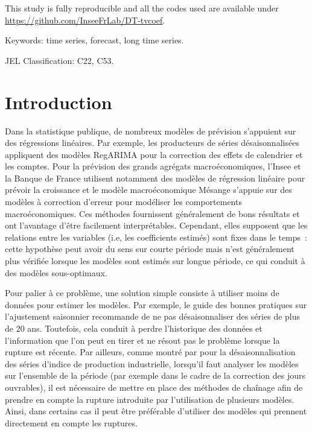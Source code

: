 \documentclass[
  a4paper,
  DIV=11,
  numbers=noendperiod,
  french]{scrartcl}
\newcommand\1{{\mathds 1}}
\theoremstyle{remark}
\begin{document}
This study is fully reproducible and all the codes used are available
under \url{https://github.com/InseeFrLab/DT-tvcoef}.

Keywords: time series, forecast, long time series.

JEL Classification: C22, C53.

\newpage

\section{Introduction}\label{introduction}

Dans la statistique publique, de nombreux modèles de prévision
s'appuient sur des régressions linéaires. Par exemple, les producteurs
de séries désaisonnalisées appliquent des modèles RegARIMA pour la
correction des effets de calendrier et les comptes. Pour la prévision
des grands agrégats macroéconomiques, l'Insee
\autocite[e.g.,][]{ndc2015prev} et la Banque de France
\autocite[e.g.,][]{OPTIM} utilisent notamment des modèles de régression
linéaire pour prévoir la croissance et le modèle macroéconomique Mésange
\autocite{mesange} s'appuie sur des modèles à correction d'erreur pour
modéliser les comportements macroéconomiques. Ces méthodes fournissent
généralement de bons résultats et ont l'avantage d'être facilement
interprétables. Cependant, elles supposent que les relations entre les
variables (i.e, les coefficients estimés) sont fixes dans le temps~:
cette hypothèse peut avoir du sens sur courte période mais n'est
généralement plus vérifiée lorsque les modèles sont estimés sur longue
période, ce qui conduit à des modèles sous-optimaux.

Pour palier à ce problème, une solution simple consiste à utiliser moins
de données pour estimer les modèles. Par exemple, le guide des bonnes
pratiques sur l'ajustement saisonnier \autocite{eurostat2015guidelines}
recommande de ne pas désaisonnaliser des séries de plus de 20 ans.
Toutefois, cela conduit à perdre l'historique des données et
l'information que l'on peut en tirer et ne résout pas le problème
lorsque la rupture est récente. Par ailleurs, comme montré par
\textcite{JMS2018} pour la désaisonnalisation des séries d'indice de
production industrielle, lorsqu'il faut analyser les modèles sur
l'ensemble de la période (par exemple dans le cadre de la correction des
jours ouvrables), il est nécessaire de mettre en place des méthodes de
chaînage afin de prendre en compte la rupture introduite par
l'utilisation de plusieurs modèles. Ainsi, dans certains cas il peut
être préférable d'utiliser des modèles qui prennent directement en
compte les ruptures.
\end{document}

